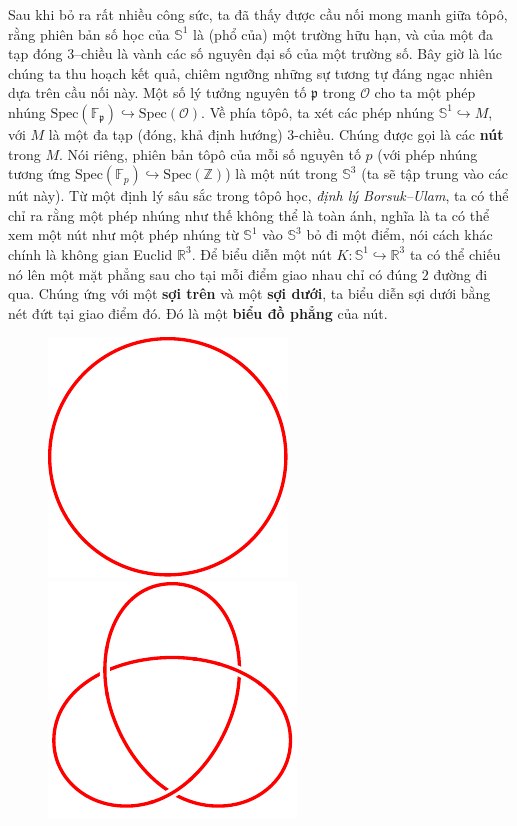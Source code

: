 \begin{multicols}{2}
	\vskip 0.1cm
	Sau khi bỏ ra rất nhiều công sức, ta đã thấy được cầu nối mong manh giữa tôpô, rằng phiên bản số học của $\mathbb{S}^1$ là (phổ của) một trường hữu hạn, và của một đa tạp đóng $3$--chiều là vành các số nguyên đại số của một trường số. Bây giờ là lúc chúng ta thu hoạch kết quả, chiêm ngưỡng những sự tương tự đáng ngạc nhiên dựa trên cầu nối này. Một số lý tưởng nguyên tố $\mathfrak{p}$ trong $\mathcal{O}$ cho ta một phép nhúng $\text{Spec}(\mathbb{F}_\mathfrak{p}) \hookrightarrow \text{Spec}(\mathcal{O})$. Về phía tôpô, ta xét các phép nhúng $\mathbb{S}^1 \hookrightarrow M$, với $M$ là một đa tạp (đóng, khả định hướng) $3$-chiều. Chúng được gọi là các {\bf\color{duongvaotoanhoc} nút} trong $M$. Nói riêng, phiên bản tôpô của mỗi số nguyên tố $p$ (với phép nhúng tương ứng $\text{Spec}(\mathbb{F}_p) \hookrightarrow \text{Spec}(\mathbb{Z})$) là một nút trong $\mathbb{S}^3$ (ta sẽ tập trung vào các nút này). Từ một định lý sâu sắc trong tôpô học, {\it định lý Borsuk--Ulam}, ta có thể chỉ ra rằng một phép nhúng như thế không thể là toàn ánh, nghĩa là ta có thể xem một nút như một phép nhúng từ $\mathbb{S}^1$ vào $\mathbb{S}^3$ bỏ đi một điểm, nói cách khác chính là không gian Euclid $\mathbb{R}^3$.
	\vskip 0.1cm
	Để biểu diễn một nút $K: \mathbb{S}^1 \hookrightarrow \mathbb{R}^3$ ta có thể chiếu nó lên một mặt phẳng sau cho tại mỗi điểm giao nhau chỉ có đúng $2$ đường đi qua. Chúng ứng với một {\bf\color{duongvaotoanhoc} sợi trên} và một {\bf\color{duongvaotoanhoc} sợi dưới}, ta biểu diễn sợi dưới bằng nét đứt tại giao điểm đó.  Đó là một {\bf\color{duongvaotoanhoc} biểu đồ phẳng} của nút.
	\begin{figure}[H]
		\vspace*{-5pt}
		\centering
		\captionsetup{labelformat= empty, justification=centering}
		\includegraphics[width= 0.28\linewidth]{unknot.pdf}\quad
		\includegraphics[width= 0.28\linewidth]{trefoil.pdf}\quad

\end{figure}
\end{multicols}
